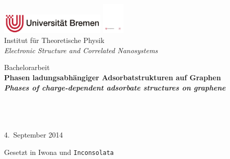 \documentclass[a4paper, 10pt, twoside, openany]{book} %
\begin{document}
	\frontmatter
	
	
	\begin{titlepage}
		\centering
		
		\normalsize
		\includegraphics[width=5cm]{Abbildungen/Uni.pdf} \hfill \includegraphics[height=1.5cm]{Abbildungen/ITP.pdf} \\
		\hfill Institut für Theoretische Physik \\
		\hfill \emph{Electronic Structure and Correlated Nanosystems}
		
		\vfill
		
		\Large
		Bachelorarbeit \\[3pc]
		
		\bf \Huge
		Phasen ladungsabhängiger Adsorbatstrukturen auf Graphen \\[3pc]
		
		\it \normalsize
		Phases of charge-dependent adsorbate structures on graphene
		
		\vfill
		
		\normalfont \large
		\hspace{0cm}\hspace{1pc} \\[1pc]
		\hspace{0cm}\hspace{1pc} \\
		\hspace{0cm}\hspace{1pc} \\[2pc]
		
		4.~September 2014
		
		\vfill
	\end{titlepage}
	
	
	\tableofcontents
	
	\vfill
	
	\begin{flushright}
		\footnotesize
		Gesetzt in Iwona und \texttt{Inconsolata}
	\end{flushright}
	
\end{document}
